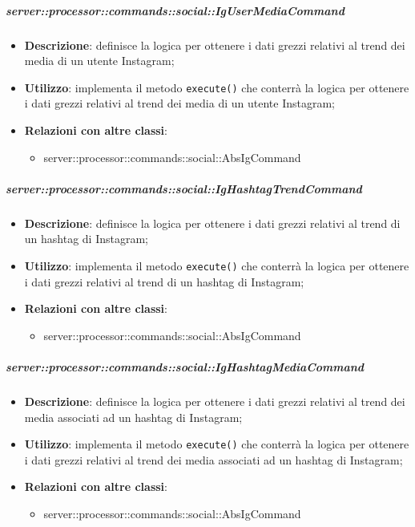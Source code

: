         \subparagraph{server::processor::commands::social::IgUserMediaCommand} %
        \label{subp:bdsm_app_server_processor_commands_social_igusermediacommand}
        \begin{itemize}
          \item \textbf{Descrizione}: definisce la logica per ottenere i dati grezzi relativi al trend dei media di un utente Instagram;
          \item \textbf{Utilizzo}: implementa il metodo \texttt{execute()} che conterrà la logica per ottenere i dati grezzi relativi al trend dei media di un utente Instagram;
          \item \textbf{Relazioni con altre classi}:
            \begin{itemize}
              \item server::processor::commands::social::AbsIgCommand
            \end{itemize}
        \end{itemize}

        \subparagraph{server::processor::commands::social::IgHashtagTrendCommand} %
        \label{subp:bdsm_app_server_processor_commands_social_ighashtagtrendcommand}
        \begin{itemize}
          \item \textbf{Descrizione}: definisce la logica per ottenere i dati grezzi relativi al trend di un hashtag di Instagram;
          \item \textbf{Utilizzo}: implementa il metodo \texttt{execute()} che conterrà la logica per ottenere i dati grezzi relativi al trend di un hashtag di Instagram;
          \item \textbf{Relazioni con altre classi}:
            \begin{itemize}
              \item server::processor::commands::social::AbsIgCommand
            \end{itemize}
        \end{itemize}

        \subparagraph{server::processor::commands::social::IgHashtagMediaCommand} %
        \label{subp:bdsm_app_server_processor_commands_social_twhashtagmediacommand}
        \begin{itemize}
          \item \textbf{Descrizione}: definisce la logica per ottenere i dati grezzi relativi al trend dei media associati ad un hashtag di Instagram;
          \item \textbf{Utilizzo}: implementa il metodo \texttt{execute()} che conterrà la logica per ottenere i dati grezzi relativi al trend dei media associati ad un hashtag di Instagram;
          \item \textbf{Relazioni con altre classi}:
            \begin{itemize}
              \item server::processor::commands::social::AbsIgCommand
            \end{itemize}
        \end{itemize}

